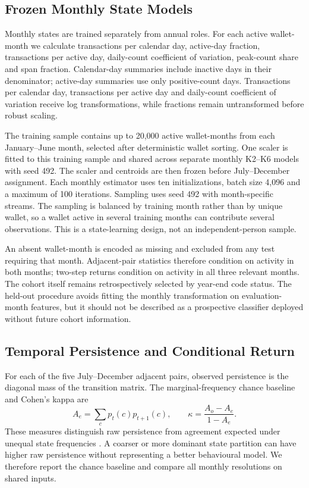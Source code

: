 \subsection{Frozen Monthly State Models}
Monthly states are trained separately from annual roles. For each active wallet-month we calculate transactions per calendar day, active-day fraction, transactions per active day, daily-count coefficient of variation, peak-count share and span fraction. Calendar-day summaries include inactive days in their denominator; active-day summaries use only positive-count days. Transactions per calendar day, transactions per active day and daily-count coefficient of variation receive log transformations, while fractions remain untransformed before robust scaling.

The training sample contains up to 20,000 active wallet-months from each January--June month, selected after deterministic wallet sorting. One scaler is fitted to this training sample and shared across separate monthly K2--K6 models with seed 492. The scaler and centroids are then frozen before July--December assignment. Each monthly estimator uses ten initializations, batch size 4,096 and a maximum of 100 iterations. Sampling uses seed 492 with month-specific streams. The sampling is balanced by training month rather than by unique wallet, so a wallet active in several training months can contribute several observations. This is a state-learning design, not an independent-person sample.

An absent wallet-month is encoded as missing and excluded from any test requiring that month. Adjacent-pair statistics therefore condition on activity in both months; two-step returns condition on activity in all three relevant months. The cohort itself remains retrospectively selected by year-end code status. The held-out procedure avoids fitting the monthly transformation on evaluation-month features, but it should not be described as a prospective classifier deployed without future cohort information.

\subsection{Temporal Persistence and Conditional Return}
For each of the five July--December adjacent pairs, observed persistence is the diagonal mass of the transition matrix. The marginal-frequency chance baseline and Cohen's kappa are
\begin{equation}
 A_e=\sum_c p_t(c)p_{t+1}(c),\qquad
 \kappa=\frac{A_o-A_e}{1-A_e}.
\end{equation}
These measures distinguish raw persistence from agreement expected under unequal state frequencies \cite{cohen1960agreement}. A coarser or more dominant state partition can have higher raw persistence without representing a better behavioural model. We therefore report the chance baseline and compare all monthly resolutions on shared inputs.

